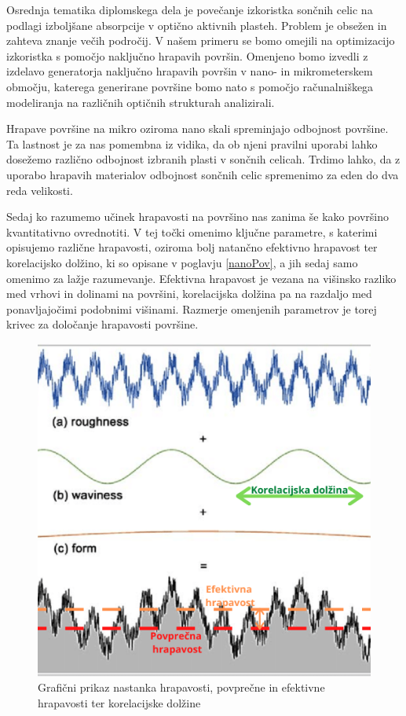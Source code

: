 \documentclass[a4paper,twoside,openright,12pt,slovene]{book}
\begin{document}
Osrednja tematika diplomskega dela je povečanje izkoristka sončnih celic na podlagi izboljšane absorpcije v optično aktivnih plasteh. Problem je obsežen in zahteva znanje večih področij. V našem primeru se bomo omejili na optimizacijo izkoristka s pomočjo naključno hrapavih površin. Omenjeno bomo izvedli z izdelavo generatorja naključno hrapavih površin v nano- in mikrometerskem območju, katerega generirane površine bomo nato s pomočjo računalniškega modeliranja na različnih optičnih strukturah analizirali.

Hrapave površine na mikro oziroma nano skali spreminjajo odbojnost površine. Ta lastnost je za nas pomembna iz vidika, da ob njeni pravilni uporabi lahko dosežemo različno odbojnost izbranih plasti v sončnih celicah. Trdimo lahko, da z uporabo hrapavih materialov odbojnost sončnih celic spremenimo za eden do dva reda velikosti.

Sedaj ko razumemo učinek hrapavosti na površino nas zanima še kako površino kvantitativno ovrednotiti. V tej točki omenimo ključne parametre, s katerimi opisujemo različne hrapavosti, oziroma bolj natančno efektivno hrapavost ter korelacijsko dolžino, ki so opisane v poglavju \ref{nanoPov}, a jih sedaj samo omenimo za lažje razumevanje. Efektivna hrapavost je vezana na višinsko razliko med vrhovi in dolinami na površini, korelacijska dolžina pa na razdaljo med ponavljajočimi podobnimi višinami. Razmerje omenjenih parametrov je torej krivec za določanje hrapavosti površine. \cite{117339} \cite{10.1002/pip.1050}

\begin{figure}[H]
    \centering
    \includegraphics[scale=0.75]{Slike/rough.png}
    \caption{Grafični prikaz nastanka hrapavosti, povprečne in efektivne hrapavosti ter korelacijske dolžine \cite{roughness}}
    \label{fig:rough}
\end{figure}
\end{document}
